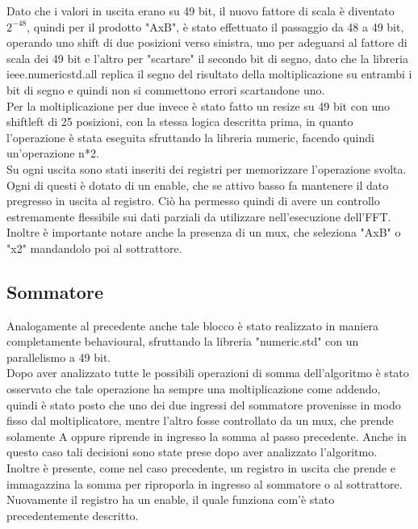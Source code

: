 \documentclass[a4paper, titlepage]{article}
\begin{document}
Dato che i valori in uscita erano su 49 bit, il nuovo fattore di scala è diventato $2^{-48}$, quindi per il prodotto "AxB", è stato effettuato il passaggio da 48 a 49 bit, operando uno shift di due posizioni verso sinistra, uno per adeguarsi al fattore di scala dei 49 bit e l'altro per "scartare" il secondo bit di segno, dato che la libreria ieee.numeric\textunderscore std.all replica il segno del risultato della moltiplicazione su entrambi i bit di segno e quindi non si commettono errori scartandone uno.\\Per la moltiplicazione per due invece è stato fatto un resize su 49 bit con uno shift\textunderscore left di 25 posizioni, con la stessa logica descritta prima, in quanto l'operazione è stata eseguita sfruttando la libreria numeric, facendo quindi un'operazione n*2.\\
Su ogni uscita sono stati inseriti dei registri per memorizzare l'operazione svolta. Ogni di questi è dotato di un enable, che se attivo basso fa mantenere il dato pregresso in uscita al registro. Ciò ha permesso quindi di avere un controllo estremamente flessibile sui dati parziali da utilizzare nell'esecuzione dell'FFT.\\Inoltre è importante notare anche la presenza di un mux, che seleziona "AxB" o "x2" mandandolo poi al sottrattore.
\subsection{Sommatore}%
Analogamente al precedente anche tale blocco è stato realizzato in maniera completamente behavioural, sfruttando la libreria "numeric.std" con un parallelismo a 49 bit.\\
Dopo aver analizzato tutte le possibili operazioni di somma dell'algoritmo è stato osservato che tale operazione ha sempre una moltiplicazione come addendo, quindi è stato posto che uno dei due ingressi del sommatore provenisse in modo fisso dal moltiplicatore, mentre l'altro fosse controllato da un mux, che prende solamente A oppure riprende in ingresso la somma al passo precedente. Anche in questo caso tali decisioni sono state prese dopo aver analizzato l'algoritmo.\\Inoltre è presente, come nel caso precedente, un registro in uscita che prende e immagazzina la somma per riproporla in ingresso al sommatore o al sottrattore. Nuovamente il registro ha un enable, il quale funziona com'è stato precedentemente descritto.
\end{document}
